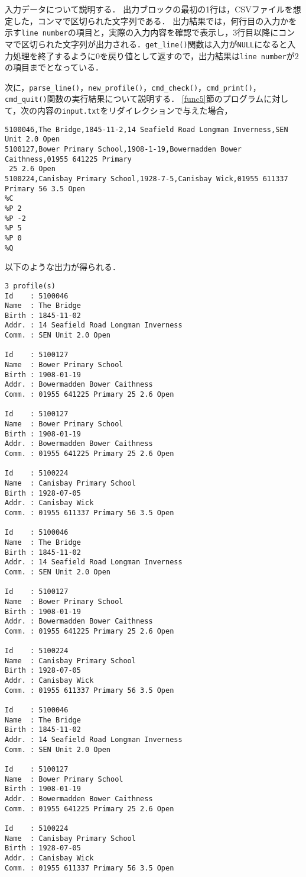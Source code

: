 入力データについて説明する．
出力ブロックの最初の1行は，CSVファイルを想定した，コンマで区切られた文字列である．
出力結果では，何行目の入力かを示す\verb|line number|の項目と，実際の入力内容を確認で表示し，3行目以降にコンマで区切られた文字列が出力される．\verb|get_line()|関数は入力が\verb|NULL|になると入力処理を終了するように$0$を戻り値として返すので，出力結果は\verb|line number|が$2$の項目までとなっている．

次に，\verb|parse_line()|，\verb|new_profile()|，\verb|cmd_check()|，\verb|cmd_print()|，\verb|cmd_quit()|関数の実行結果について説明する．
\ref{func5}節のプログラムに対して，次の内容の\verb|input.txt|をリダイレクションで与えた場合，

{\fontsize{10pt}{11pt} \selectfont
 \begin{verbatim}
5100046,The Bridge,1845-11-2,14 Seafield Road Longman Inverness,SEN Unit 2.0 Open
5100127,Bower Primary School,1908-1-19,Bowermadden Bower Caithness,01955 641225 Primary
 25 2.6 Open
5100224,Canisbay Primary School,1928-7-5,Canisbay Wick,01955 611337 Primary 56 3.5 Open
%C
%P 2
%P -2
%P 5
%P 0
%Q
 \end{verbatim}
}

\noindent %
以下のような出力が得られる．

{\fontsize{10pt}{11pt} \selectfont
 \begin{verbatim}
3 profile(s)
Id    : 5100046
Name  : The Bridge
Birth : 1845-11-02
Addr. : 14 Seafield Road Longman Inverness
Comm. : SEN Unit 2.0 Open

Id    : 5100127
Name  : Bower Primary School
Birth : 1908-01-19
Addr. : Bowermadden Bower Caithness
Comm. : 01955 641225 Primary 25 2.6 Open

Id    : 5100127
Name  : Bower Primary School
Birth : 1908-01-19
Addr. : Bowermadden Bower Caithness
Comm. : 01955 641225 Primary 25 2.6 Open

Id    : 5100224
Name  : Canisbay Primary School
Birth : 1928-07-05
Addr. : Canisbay Wick
Comm. : 01955 611337 Primary 56 3.5 Open

Id    : 5100046
Name  : The Bridge
Birth : 1845-11-02
Addr. : 14 Seafield Road Longman Inverness
Comm. : SEN Unit 2.0 Open

Id    : 5100127
Name  : Bower Primary School
Birth : 1908-01-19
Addr. : Bowermadden Bower Caithness
Comm. : 01955 641225 Primary 25 2.6 Open

Id    : 5100224
Name  : Canisbay Primary School
Birth : 1928-07-05
Addr. : Canisbay Wick
Comm. : 01955 611337 Primary 56 3.5 Open

Id    : 5100046
Name  : The Bridge
Birth : 1845-11-02
Addr. : 14 Seafield Road Longman Inverness
Comm. : SEN Unit 2.0 Open

Id    : 5100127
Name  : Bower Primary School
Birth : 1908-01-19
Addr. : Bowermadden Bower Caithness
Comm. : 01955 641225 Primary 25 2.6 Open

Id    : 5100224
Name  : Canisbay Primary School
Birth : 1928-07-05
Addr. : Canisbay Wick
Comm. : 01955 611337 Primary 56 3.5 Open

 \end{verbatim}
}

